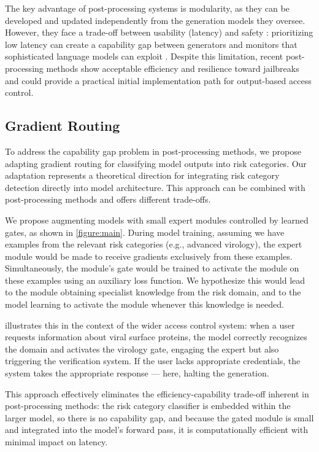 \documentclass{article}
\theoremstyle{plain}
\theoremstyle{definition}
\theoremstyle{remark}
\begin{document}
The key advantage of post-processing systems is modularity, as they
can be developed and updated independently from the generation models
they oversee.
However, they face a trade-off between usability (latency) and safety
\cite{kumar2025freelunchguardrails}: prioritizing low latency can
create a capability gap between generators and monitors that
sophisticated language models can exploit
\cite{jin2024jailbreakinglargelanguagemodels}.
Despite this limitation, recent post-processing methods show
acceptable efficiency and resilience toward jailbreaks
\cite{sharma2025constitutionalclassifiersdefendinguniversal} and
could provide a practical initial implementation path for
output-based access control.

\subsection{Gradient Routing} \label{section:gradient-routing}

To address the capability gap problem in post-processing methods, we
propose adapting gradient routing
\cite{cloud2024gradientroutingmaskinggradients} for classifying model
outputs into risk categories.
Our adaptation represents a theoretical direction for integrating
risk category detection directly into model architecture.
This approach can be combined with post-processing methods and offers
different trade-offs.

We propose augmenting models with small expert modules controlled by
learned gates, as shown in \cref{figure:main}.
During model training, assuming we have examples from the relevant
risk categories (e.g., advanced virology), the expert module would be
made to receive gradients exclusively from these examples.
Simultaneously, the module's gate would be trained to activate the
module on these examples using an auxiliary loss function.
We hypothesize this would lead to the module obtaining specialist
knowledge from the risk domain, and to the model learning to activate
the module whenever this knowledge is needed.

 illustrates this in the context of the wider
access control system: when a user requests information about viral
surface proteins, the model correctly recognizes the domain and
activates the virology gate, engaging the expert but also triggering
the verification system. If the user lacks appropriate credentials,
the system takes the appropriate response --- here, halting the generation.

This approach effectively eliminates the efficiency-capability
trade-off inherent in post-processing methods: the risk category
classifier is embedded within the larger model, so there is no
capability gap, and because the gated module is small and integrated
into the model's forward pass, it is computationally efficient with
minimal impact on latency.
\end{document}
